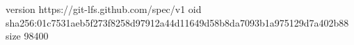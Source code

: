 version https://git-lfs.github.com/spec/v1
oid sha256:01c7531aeb5f273f8258d97912a44d11649d58b8da7093b1a975129d7a402b88
size 98400
